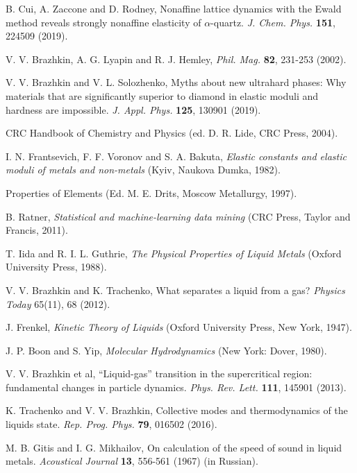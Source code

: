 \documentclass[aps,prl,groupedaddress,fleqn,twocolumn,10pt]{revtex4}
\begin{document}
\begin{thebibliography}{99}
 B. Cui, A. Zaccone and D. Rodney, Nonaffine lattice dynamics with the Ewald method reveals strongly nonaffine elasticity of $\alpha$-quartz.
{\it J. Chem. Phys.} {\bf 151}, 224509 (2019).

 V. V. Brazhkin, A. G. Lyapin and R. J. Hemley, {\it Phil. Mag.} {\bf 82}, 231-253 (2002).

 V. V. Brazhkin and V. L. Solozhenko, Myths about new ultrahard phases: Why materials that are significantly superior to diamond in elastic moduli and hardness are impossible. {\it J. Appl. Phys.} {\bf 125}, 130901 (2019).


 CRC Handbook of Chemistry and Physics (ed. D. R. Lide, CRC Press, 2004).

 I. N. Frantsevich, F. F. Voronov and S. A. Bakuta, {\it Elastic constants and elastic moduli of metals and non-metals} (Kyiv, Naukova Dumka, 1982).

 Properties of Elements (Ed. M. E. Drits, Moscow Metallurgy, 1997).

 B. Ratner, {\it Statistical and machine-learning data mining} (CRC Press, Taylor and Francis, 2011).

 T. Iida and R. I. L. Guthrie, {\it The Physical Properties of Liquid Metals} (Oxford University Press, 1988).

 V. V. Brazhkin and K. Trachenko, What separates a liquid from a gas? {\it Physics Today} 65(11), 68 (2012).

 J. Frenkel, {\it Kinetic Theory of Liquids} (Oxford University Press, New York, 1947).

 J. P. Boon and S. Yip, {\it Molecular Hydrodynamics} (New York: Dover, 1980).

 V. V. Brazhkin et al, ``Liquid-gas'' transition in the supercritical region: fundamental changes in particle dynamics. {\it Phys. Rev. Lett.} {\bf 111}, 145901 (2013).

 K. Trachenko and V. V. Brazhkin, Collective modes and thermodynamics of the liquids state. {\it Rep. Prog. Phys.} {\bf 79}, 016502 (2016).

 M. B. Gitis and I. G. Mikhailov, On calculation of the speed of sound in liquid metals. {\it Acoustical Journal} {\bf 13}, 556-561 (1967) (in Russian).


\end{thebibliography}
\end{document}
